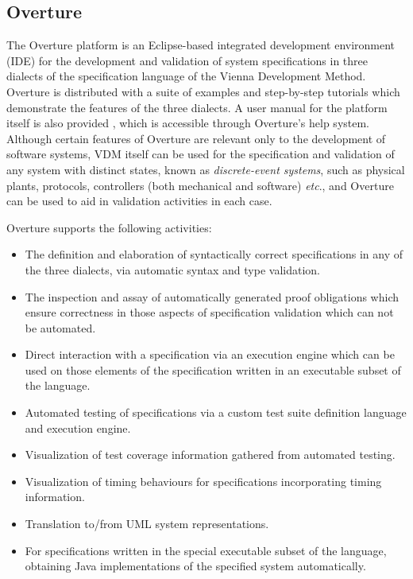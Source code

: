 \subsection{Overture}\label{app:overture}
The Overture platform \cite{Larsen&10a} is an Eclipse-based integrated development environment (IDE) for the development and validation of system specifications in three dialects of the specification language of the Vienna Development Method.
%
Overture is distributed with a suite of examples and step-by-step tutorials which demonstrate the features of the three dialects.
%
A user manual for the platform itself is also provided \cite{Larsen&13a}, which is accessible through Overture's help system.
%
Although certain features of Overture are relevant only to the development of software systems, VDM itself can be used for the specification and validation of any system with distinct states, known as \emph{discrete-event systems}, such as physical plants, protocols, controllers (both mechanical and software) \emph{etc}.\@, and Overture can be used to aid in validation activities in each case.

Overture supports the following activities:
%
%
%
\begin{itemize}
%
\item  The definition and elaboration of syntactically correct specifications in any of the three dialects, via automatic syntax and type validation.
%
\item  The inspection and assay of automatically generated proof obligations which ensure correctness in those aspects of specification validation which can not be automated.
%
\item  Direct interaction with a specification via an execution engine which can be used on those elements of the specification written in an executable subset of the language.
%
\item  Automated testing of specifications via a custom test suite definition language and execution engine.
%
\item  Visualization of test coverage information gathered from automated testing.
%
\item  Visualization of timing behaviours for specifications incorporating timing information.
%
\item  Translation to/from UML system representations.
%
\item  For specifications written in the special executable subset of the language, obtaining Java implementations of the specified system automatically.
%
\end{itemize}
%
%
%

